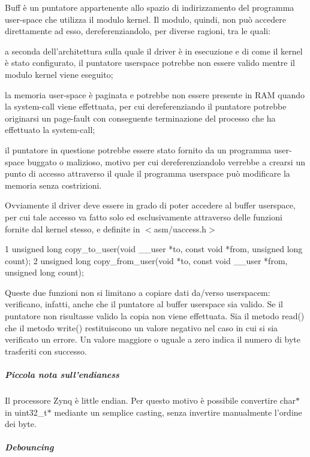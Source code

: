 Buff è un puntatore appartenente allo spazio di indirizzamento del programma user-\/space che utilizza il modulo kernel. Il modulo, quindi, non può accedere direttamente ad esso, dereferenziandolo, per diverse ragioni, tra le quali\+:
\begin{DoxyItemize}
\item a seconda dell'architettura sulla quale il driver è in esecuzione e di come il kernel è stato configurato, il puntatore userspace potrebbe non essere valido mentre il modulo kernel viene eseguito;
\item la memoria user-\/space è paginata e potrebbe non essere presente in R\+A\+M quando la system-\/call viene effettuata, per cui dereferenziando il puntatore potrebbe originarsi un page-\/fault con conseguente terminazione del processo che ha effettuato la system-\/call;
\item il puntatore in questione potrebbe essere stato fornito da un programma user-\/space buggato o malizioso, motivo per cui dereferenziandolo verrebbe a crearsi un punto di accesso attraverso il quale il programma userspace può modificare la memoria senza costrizioni.
\end{DoxyItemize}

Ovviamente il driver deve essere in grado di poter accedere al buffer userspace, per cui tale accesso va fatto solo ed esclusivamente attraverso delle funzioni fornite dal kernel stesso, e definite in $<$asm/uaccess.\+h$>$ 
\begin{DoxyCode}
1 unsigned long copy\_to\_user(void \_\_user *to, const void *from, unsigned long count);
2 unsigned long copy\_from\_user(void *to, const void \_\_user *from, unsigned long count);
\end{DoxyCode}
 Queste due funzioni non si limitano a copiare dati da/verso userspacem\+: verificano, infatti, anche che il puntatore al buffer userspace sia valido. Se il puntatore non risultasse valido la copia non viene effettuata. Sia il metodo read() che il metodo write() restituiscono un valore negativo nel caso in cui si sia verificato un errore. Un valore maggiore o uguale a zero indica il numero di byte trasferiti con successo.

\subparagraph*{Piccola nota sull'endianess}

Il processore Zynq è little endian. Per questo motivo è possibile convertire char$\ast$ in uint32\+\_\+t$\ast$ mediante un semplice casting, senza invertire manualmente l'ordine dei byte.

\subparagraph*{Debouncing}

